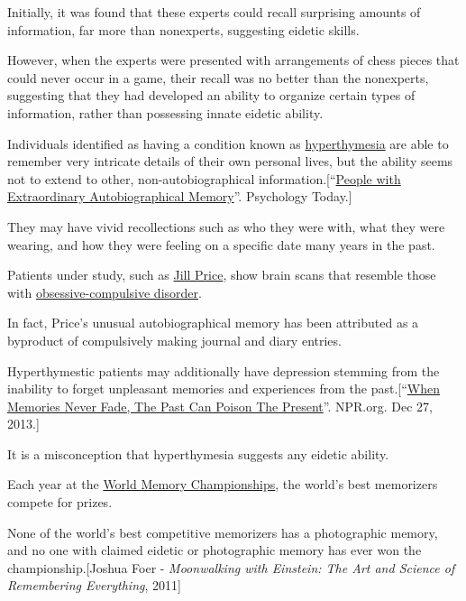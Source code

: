 \documentclass{book}
\numberwithin{equation}{section}
\begin{document}
Initially, it was found that these experts could recall surprising amounts of information, far more than nonexperts, suggesting eidetic skills.

However, when the experts were presented with arrangements of chess pieces that could never occur in a game, their recall was no better than the nonexperts, suggesting that they had developed an ability to organize certain types of information, rather than possessing innate eidetic ability.

%
Individuals identified as having a condition known as \href{https://en.wikipedia.org/wiki/Hyperthymesia}{hyperthymesia} are able to remember very intricate details of their own personal lives, but the ability seems not to extend to other, non-autobiographical information.[``\href{http://www.psychologytoday.com/blog/quirks-memory/201301/people-extraordinary-autobiographical-memory}{People with Extraordinary Autobiographical Memory}''. Psychology Today.]

They may have vivid recollections such as who they were with, what they were wearing, and how they were feeling on a specific date many years in the past.

Patients under study, such as \href{https://en.wikipedia.org/wiki/Jill_Price}{Jill Price}, show brain scans that resemble those with \href{https://en.wikipedia.org/wiki/Obsessive-compulsive_disorder}{obsessive-compulsive disorder}.

In fact, Price's unusual autobiographical memory has been attributed as a byproduct of compulsively making journal and diary entries.

Hyperthymestic patients may additionally have depression stemming from the inability to forget unpleasant memories and experiences from the past.[``\href{https://www.npr.org/blogs/health/2013/12/18/255285479/when-memories-never-fade-the-past-can-poison-the-present}{When Memories Never Fade, The Past Can Poison The Present}''. NPR.org. Dec 27, 2013.]

It is a misconception that hyperthymesia suggests any eidetic ability.

%
Each year at the \href{https://en.wikipedia.org/wiki/World_Memory_Championships}{World Memory Championships}, the world's best memorizers compete for prizes.

None of the world's best competitive memorizers has a photographic memory, and no one with claimed eidetic or photographic memory has ever won the championship.[Joshua Foer - \textit{Moonwalking with Einstein: The Art and Science of Remembering Everything}, 2011]
\end{document}
